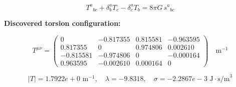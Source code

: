 
\begin{equation}
  T^a{}_{bc} + \delta^a_b T_c - \delta^a_c T_b = 8\pi G \, s^a{}_{bc}
\end{equation}

\textbf{Discovered torsion configuration:}

\begin{equation}
  T^{\mu\nu} = \begin{pmatrix}
    0 & -0.817355 & 0.815581 & -0.963595 \\
    0.817355 & 0 & 0.974806 & 0.002610 \\
    -0.815581 & -0.974806 & 0 & -0.000164 \\
    0.963595 & -0.002610 & 0.000164 & 0
  \end{pmatrix} \quad \text{m}^{-1}
\end{equation}

\begin{equation}
  |T| = 1.7922e+0 \text{ m}^{-1}, \quad
  \lambda = -9.8318, \quad
  \sigma = -2.2867e-3 \text{ J}\cdot\text{s/m}^3
\end{equation}